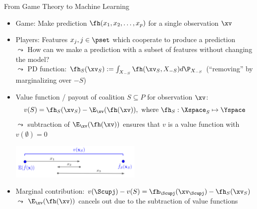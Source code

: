 \documentclass[11pt,compress,t,notes=noshow, aspectratio=169, xcolor=table]{beamer}
\begin{document}
\begin{frame}{From Game Theory to Machine Learning}
\begin{itemize}[<+->]
    \item Game: Make prediction $\fh(x_1, x_2, \ldots, x_p)$ for a single observation $\xv$
    \item Players: Features $x_j, j \in \pset$ which cooperate to produce a prediction\\
    $\leadsto$ How can we make a prediction with a subset of features without changing the model?
    \\ 
    $\leadsto$ PD function: $\fh_{S}(\xv_S) := \int_{X_{-S}} \fh(\xv_S, X_{-S})d \P_{X_{-S}}$ (``removing'' by marginalizing over $-S$)
    \item  Value function / payout of coalition $S \subseteq P$ for observation $\xv$:
    $$v(S) =  \fh_{S} (\xv_S) - \E_{\xv}(\fh(\xv)), \text{ where } %
    \fh_S: \Xspace_S \mapsto \Yspace$$
    $\leadsto$ subtraction of $\E_{\xv}(\fh(\xv))$ ensures that $v$ is a value function with $v(\emptyset) = 0$
    \centerline{\includegraphics[width=0.5\textwidth, trim=20 0 0 100, clip]{figure_man/shapley_valuefct}}
    \item Marginal contribution: $v(\Scupj) - v(S) =  \fh_{\Scupj} (\xv_{\Scupj}) - \fh_{S} (\xv_{S})$\\
    $\leadsto$ $\E_{\xv}(\fh(\xv))$ cancels out due to the subtraction of value functions
\end{itemize}
\end{frame}
\end{document}

